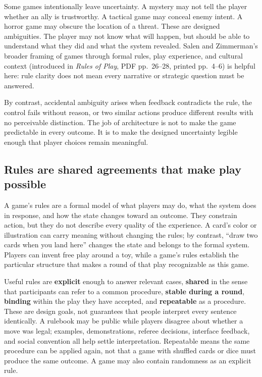 Some games intentionally leave uncertainty. A mystery may not tell the player whether an ally is trustworthy. A tactical game may conceal enemy intent. A horror game may obscure the location of a threat. These are designed ambiguities. The player may not know what will happen, but should be able to understand what they did and what the system revealed. Salen and Zimmerman's broader framing of games through formal rules, play experience, and cultural context (introduced in \emph{Rules of Play}, PDF pp.~26--28, printed pp.~4--6) is helpful here: rule clarity does not mean every narrative or strategic question must be answered.

By contrast, accidental ambiguity arises when feedback contradicts the rule, the control fails without reason, or two similar actions produce different results with no perceivable distinction. The job of architecture is not to make the game predictable in every outcome. It is to make the designed uncertainty legible enough that player choices remain meaningful.

\subsection{Rules are shared agreements that make play possible}\label{05-engine-i-ch009-rules-are-shared-agreements-that-make-play-possible}

\hypertarget{05-engine-i-ch009-rules-are-shared-agreements-that-make-play-possible}{}

A game's rules are a formal model of what players may do, what the system does in response, and how the state changes toward an outcome. They constrain action, but they do not describe every quality of the experience. A card's color or illustration can carry meaning without changing the rules; by contrast, ``draw two cards when you land here'' changes the state and belongs to the formal system. Players can invent free play around a toy, while a game's rules establish the particular structure that makes a round of that play recognizable as this game.

Useful rules are \textbf{explicit} enough to answer relevant cases, \textbf{shared} in the sense that participants can refer to a common procedure, \textbf{stable during a round}, \textbf{binding} within the play they have accepted, and \textbf{repeatable} as a procedure. These are design goals, not guarantees that people interpret every sentence identically. A rulebook may be public while players disagree about whether a move was legal; examples, demonstrations, referee decisions, interface feedback, and social convention all help settle interpretation. Repeatable means the same procedure can be applied again, not that a game with shuffled cards or dice must produce the same outcome. A game may also contain randomness as an explicit rule.

